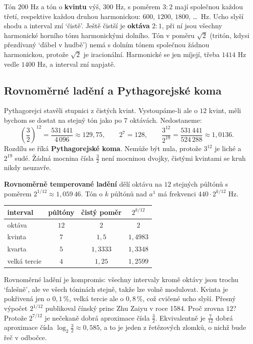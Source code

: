 Tón $200$ Hz a tón o \textbf{kvintu} výš, $300$ Hz, s poměrem $3:2$ mají společnou každou třetí, respektive každou druhou harmonickou: $600$, $1200$, $1800$, \dots\ Hz. Ucho slyší shodu a interval zní `čistě'. Ještě čistší je \textbf{oktáva} $2:1$, při ní jsou všechny harmonické horního tónu harmonickými dolního. Tón v poměru $\sqrt{2}$ (tritón, kdysi přezdívaný `ďábel v hudbě') nemá s dolním tónem společnou žádnou harmonickou, protože $\sqrt{2}$ je iracionální. Harmonické se jen míjejí, třeba $1414$ Hz vedle $1400$ Hz, a interval zní napjatě.

\subsection{Rovnoměrné ladění a Pythagorejské koma}

Pythagorejci stavěli stupnici z čistých kvint. Vystoupáme-li ale o $12$ kvint, měli bychom se dostat na stejný tón jako po $7$ oktávách. Nedostaneme:
\begin{equation*}
  \left(\frac{3}{2}\right)^{12} = \frac{531\,441}{4\,096}\approx 129{,}75,\qquad 2^7 = 128,\qquad\frac{3^{12}}{2^{19}} = \frac{531\,441}{524\,288}\approx 1{,}0136.
\end{equation*}
Rozdílu se říká \textbf{Pythagorejské koma}. Nemůže být nula, protože $3^{12}$ je liché a $2^{19}$ sudé. Žádná mocnina čísla $\frac{3}{2}$ není mocninou dvojky, čistými kvintami se kruh nikdy neuzavře.

\begin{definitionbox}
  \textbf{Rovnoměrně temperované ladění} dělí oktávu na $12$ stejných půltónů s poměrem $2^{1/12}\approx 1{,}059\,46$. Tón o $k$ půltónů nad $a^1$ má frekvenci $440\cdot 2^{k/12}$ Hz.
\end{definitionbox}

\begin{center}
  \begin{tabular}{|l|c|c|c|}
    \hline
    interval & půltóny & čistý poměr & $2^{k/12}$\\
    \hline
    oktáva & $12$ & $2$ & $2$\\
    kvinta & $7$ & $1{,}5$ & $1{,}4983$\\
    kvarta & $5$ & $1{,}3333$ & $1{,}3348$\\
    velká tercie & $4$ & $1{,}25$ & $1{,}2599$\\
    \hline
  \end{tabular}
\end{center}

Rovnoměrné ladění je kompromis: všechny intervaly kromě oktávy jsou trochu `falešně', ale ve všech tóninách stejně, takže lze volně modulovat. Kvinta je pokřivená jen o $0{,}1\,\%$, velká tercie ale o $0{,}8\,\%$, což cvičené ucho slyší. Přesný výpočet $2^{1/12}$ publikoval čínský princ Zhu Zaiyu v roce 1584. Proč zrovna $12$? Protože $2^{7/12}$ je nečekaně dobrá aproximace čísla $\frac{3}{2}$. Ekvivalentně je $\frac{7}{12}$ dobrá aproximace čísla $\log_2\frac{3}{2}\approx 0{,}585$, a to je jeden z řetězových zlomků, o nichž bude řeč v odbočce.

